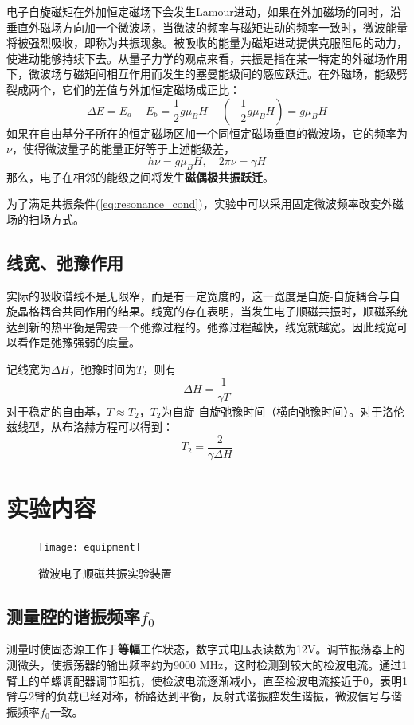 \documentclass[aps,pre,12pt,preprint,onecolumn,showpacs,showkeys]{revtex4-1}
\begin{document}
    电子自旋磁矩在外加恒定磁场下会发生Lamour进动，如果在外加磁场的同时，沿垂直外磁场方向加一个微波场，当微波的频率与磁矩进动的频率一致时，微波能量将被强烈吸收，即称为共振现象。被吸收的能量为磁矩进动提供克服阻尼的动力，使进动能够持续下去。从量子力学的观点来看，共振是指在某一特定的外磁场作用下，微波场与磁矩间相互作用而发生的塞曼能级间的感应跃迁。在外磁场，能级劈裂成两个，它们的差值与外加恒定磁场成正比：
    \begin{equation}
        \Delta E= E_a - E_b =\frac{1}{2}g \mu_B H- (-\frac{1}{2}g \mu_B H)=g \mu_B H
    \end{equation}
    如果在自由基分子所在的恒定磁场区加一个同恒定磁场垂直的微波场，它的频率为$\nu$，使得微波量子的能量正好等于上述能级差，
    \begin{equation}
        h \nu = g \mu_B H, \quad 2\pi \nu=\gamma H \label{eq:resonance_cond}
    \end{equation}
    那么，电子在相邻的能级之间将发生\textbf{磁偶极共振跃迁}。

    为了满足共振条件(\ref{eq:resonance_cond})，实验中可以采用固定微波频率改变外磁场的扫场方式。

    \subsection{线宽、弛豫作用}
    实际的吸收谱线不是无限窄，而是有一定宽度的，这一宽度是自旋-自旋耦合与自旋晶格耦合共同作用的结果。线宽的存在表明，当发生电子顺磁共振时，顺磁系统达到新的热平衡是需要一个弛豫过程的。弛豫过程越快，线宽就越宽。因此线宽可以看作是弛豫强弱的度量。

    记线宽为$\Delta H$，弛豫时间为$T$，则有
    \begin{equation}
        \Delta H= \frac{1}{\gamma T}
    \end{equation}
    对于稳定的自由基，$T\approx T_2$，$T_2$为自旋-自旋弛豫时间（横向弛豫时间）。对于洛伦兹线型，从布洛赫方程可以得到：
    \begin{equation}
        T_2 =\frac{2} {\gamma \Delta H}\label{eq:time}
    \end{equation}

\section{实验内容}
\begin{figure}[ht]
    \centering
    \texttt{[image: equipment]}
    \caption{\label{fig:equipment}%
    微波电子顺磁共振实验装置}
\end{figure}
    \subsection{测量腔的谐振频率$f_0$}
    测量时使固态源工作于\textbf{等幅}工作状态，数字式电压表读数为12V。调节振荡器上的测微头，使振荡器的输出频率约为9000 MHz，这时检测到较大的检波电流。通过1臂上的单螺调配器调节阻抗，使检波电流逐渐减小，直至检波电流接近于0，表明1臂与2臂的负载已经对称，桥路达到平衡，反射式谐振腔发生谐振，微波信号与谐振频率$f_0$一致。
\end{document}
